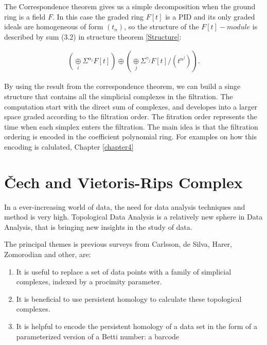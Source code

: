 \documentclass[11pt,a4paper]{report}
\begin{document}
            The Correspondence theorem gives us a simple decomposition when the ground ring is a field $F$. In this case the graded ring $F[t]$ is a PID and its only graded ideals are homogeneous of form $(t_n)$, so the structure of the $F[t]-module$ is described by sum (3.2) in structure theorem \ref{Structure}:

            \begin{align}
                (\underset{i}{\oplus} \Sigma^{\alpha_i} F[t]) \oplus (\underset{j}{\oplus} \Sigma ^{\gamma_j} F[t]/(t^{n^j})).
              \end{align}
              
              By using the result from the correspondence theorem, we can build a singe structure that contains all the simplicial complexes in the filtration. The computation start with the direct sum of complexes, and developes into a larger space graded according to the filtration order. The fitration order represents the time when each simplex enters the filtration. The main idea is that the filtration ordering is encoded in the coefficient
              polynomial ring. For examples on how this encoding is calulated, Chapter \ref{chapter4}
              
              
              \section{\v{C}ech and Vietoris-Rips Complex}
              \label{CechRips}
              
              In a ever-increasing world of data, the need for data analysis techniques and method is very high. 
              Topological Data Analysis is a relatively new sphere in Data Analysis, that is bringing new insights in the study of data. 
              
              The principal themes is previous surveys from Carlsson, de Silva, Harer, Zomorodian and other, are:
              \begin{enumerate}
               \item It is useful to replace a set of data points with a family of simplicial complexes, indexed by a 
               procimity parameter. 
               \item It is beneficial to use persistent homology to calculate these topological complexes.
               \item It is helpful to encode the persistent homology of a data set in the form
of a parameterized version of a Betti number: a barcode
              \end{enumerate}
              
\end{document}
